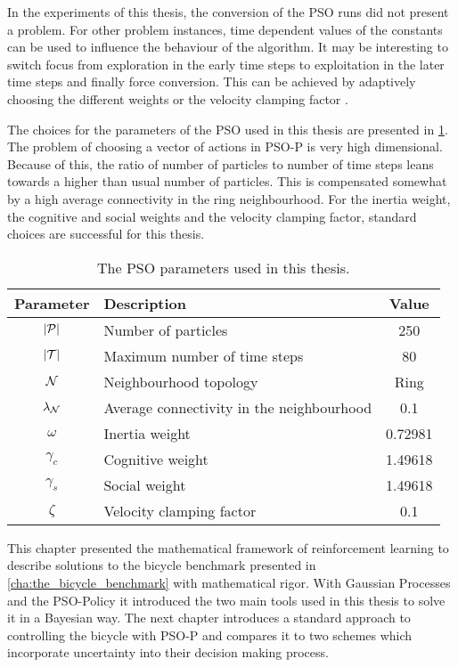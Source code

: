 In the experiments of this thesis, the conversion of the PSO runs did not present a problem.
For other problem instances, time dependent values of the constants can be used to influence the behaviour of the algorithm.
It may be interesting to switch focus from exploration in the early time steps to exploitation in the later time steps and finally force conversion.
This can be achieved by adaptively choosing the different weights or the velocity clamping factor \cite{engelbrecht_fundamentals_2006}.

The choices for the parameters of the PSO used in this thesis are presented in \cref{tab:pso_parameters}.
The problem of choosing a vector of actions in PSO-P is very high dimensional.
Because of this, the ratio of number of particles to number of time steps leans towards a higher than usual number of particles.
This is compensated somewhat by a high average connectivity in the ring neighbourhood.
For the inertia weight, the cognitive and social weights and the velocity clamping factor, standard choices are successful for this thesis.
\begin{table}[t]
    \centering
    \caption{The PSO parameters used in this thesis.}
    \label{tab:pso_parameters}
    \begin{tabularx}{\tablewidth}{cXc}
        \toprule
        Parameter & Description & Value \\
        \midrule
        $\abs{\Pe}$ & Number of particles & 250 \\
        $\vert\mathcal{T}\vert$ & Maximum number of time steps & 80 \\
        $\operatorname{\mathcal{N}}$ & Neighbourhood topology & Ring \\
        $\lambda_{\operatorname{\mathcal{N}}}$ & Average connectivity in the neighbourhood & 0.1 \\
        $\omega$ & Inertia weight & 0.72981 \\
        $\gamma_c$ & Cognitive weight & 1.49618 \\
        $\gamma_s$ & Social weight & 1.49618 \\
        $\zeta$ & Velocity clamping factor & 0.1 \\
        \bottomrule
    \end{tabularx}
\end{table}

This chapter presented the mathematical framework of reinforcement learning to describe solutions to the bicycle benchmark presented in \cref{cha:the_bicycle_benchmark} with mathematical rigor.
With Gaussian Processes and the PSO-Policy it introduced the two main tools used in this thesis to solve it in a Bayesian way.
The next chapter introduces a standard approach to controlling the bicycle with PSO-P and compares it to two schemes which incorporate uncertainty into their decision making process.
